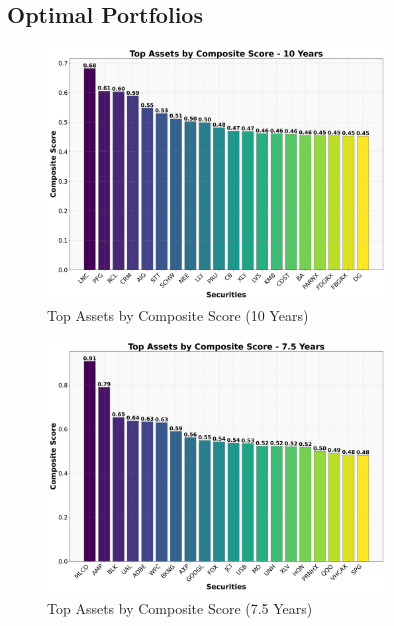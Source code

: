 \newpage

\subsection{Optimal Portfolios}


\begin{figure}[!htbp]
    \centering
    \includegraphics[width=0.8\textwidth]{../Figures/top_assets_composite_score_10_years.png}
    \caption{Top Assets by Composite Score (10 Years)}
    \label{fig:top_assets_10y}
\end{figure}

\begin{figure}[!htbp]
    \centering
    \includegraphics[width=0.8\textwidth]{../Figures/top_assets_composite_score_7_5_years.png}
    \caption{Top Assets by Composite Score (7.5 Years)}
    \label{fig:top_assets_7_5y}
\end{figure}

